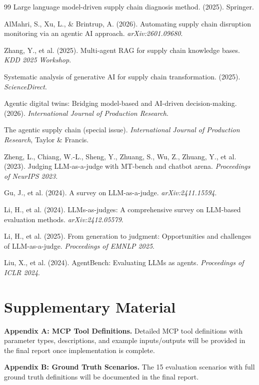 \documentclass[12pt,a4paper]{report}
\begin{document}
\begin{thebibliography}{99}
Large language model-driven supply chain diagnosis method. (2025). Springer.

AlMahri, S., Xu, L., \& Brintrup, A. (2026). Automating supply chain disruption monitoring via an agentic AI approach. \textit{arXiv:2601.09680}.

Zhang, Y., et al. (2025). Multi-agent RAG for supply chain knowledge bases. \textit{KDD 2025 Workshop}.

Systematic analysis of generative AI for supply chain transformation. (2025). \textit{ScienceDirect}.

Agentic digital twins: Bridging model-based and AI-driven decision-making. (2026). \textit{International Journal of Production Research}.

The agentic supply chain (special issue). \textit{International Journal of Production Research}, Taylor \& Francis.

Zheng, L., Chiang, W.-L., Sheng, Y., Zhuang, S., Wu, Z., Zhuang, Y., et al. (2023). Judging LLM-as-a-judge with MT-bench and chatbot arena. \textit{Proceedings of NeurIPS 2023}.

Gu, J., et al. (2024). A survey on LLM-as-a-judge. \textit{arXiv:2411.15594}.

Li, H., et al. (2024). LLMs-as-judges: A comprehensive survey on LLM-based evaluation methods. \textit{arXiv:2412.05579}.

Li, H., et al. (2025). From generation to judgment: Opportunities and challenges of LLM-as-a-judge. \textit{Proceedings of EMNLP 2025}.

Liu, X., et al. (2024). AgentBench: Evaluating LLMs as agents. \textit{Proceedings of ICLR 2024}.

\end{thebibliography}

\newpage
{}
\appendix
\chapter{Supplementary Material}

\textbf{Appendix A: MCP Tool Definitions.} Detailed MCP tool definitions with parameter types, descriptions, and example inputs/outputs will be provided in the final report once implementation is complete.

\vspace{1em}

\textbf{Appendix B: Ground Truth Scenarios.} The 15 evaluation scenarios with full ground truth definitions will be documented in the final report.
\end{document}
